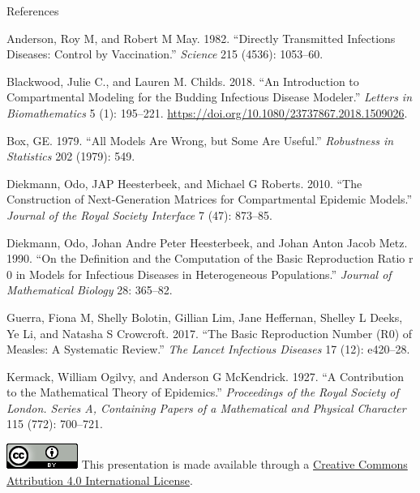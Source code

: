 \documentclass[
  ignorenonframetext,
]{beamer}
\newlength{\cslhangindent}
\newenvironment{CSLReferences}[2] %
 {\begin{list}{}{%
  \setlength{\itemindent}{0pt}
  \setlength{\leftmargin}{0pt}
  \setlength{\parsep}{0pt}
  \ifodd #1
   \setlength{\leftmargin}{\cslhangindent}
   \setlength{\itemindent}{-1\cslhangindent}
  \fi
  \setlength{\itemsep}{#2\baselineskip}}}
 {\end{list}}
\begin{document}
\begin{frame}
\begin{block}{References}
\label{references}
\label{refs}
\begin{CSLReferences}{1}{0}
Anderson, Roy M, and Robert M May. 1982. {``Directly Transmitted
Infections Diseases: Control by Vaccination.''} \emph{Science} 215
(4536): 1053--60.

Blackwood, Julie C., and Lauren M. Childs. 2018. {``An Introduction to
Compartmental Modeling for the Budding Infectious Disease Modeler.''}
\emph{Letters in Biomathematics} 5 (1): 195--221.
\url{https://doi.org/10.1080/23737867.2018.1509026}.

Box, GE. 1979. {``All Models Are Wrong, but Some Are Useful.''}
\emph{Robustness in Statistics} 202 (1979): 549.

Diekmann, Odo, JAP Heesterbeek, and Michael G Roberts. 2010. {``The
Construction of Next-Generation Matrices for Compartmental Epidemic
Models.''} \emph{Journal of the Royal Society Interface} 7 (47):
873--85.

Diekmann, Odo, Johan Andre Peter Heesterbeek, and Johan Anton Jacob
Metz. 1990. {``On the Definition and the Computation of the Basic
Reproduction Ratio r 0 in Models for Infectious Diseases in
Heterogeneous Populations.''} \emph{Journal of Mathematical Biology} 28:
365--82.

Guerra, Fiona M, Shelly Bolotin, Gillian Lim, Jane Heffernan, Shelley L
Deeks, Ye Li, and Natasha S Crowcroft. 2017. {``The Basic Reproduction
Number (R0) of Measles: A Systematic Review.''} \emph{The Lancet
Infectious Diseases} 17 (12): e420--28.

Kermack, William Ogilvy, and Anderson G McKendrick. 1927. {``A
Contribution to the Mathematical Theory of Epidemics.''}
\emph{Proceedings of the Royal Society of London. Series A, Containing
Papers of a Mathematical and Physical Character} 115 (772): 700--721.

\end{CSLReferences}
\end{block}
\end{frame}

\begin{frame}
\includegraphics{slides_files/mediabag/88x31.png} This presentation is
made available through a
\href{https://creativecommons.org/licenses/by/4.0/}{Creative Commons
Attribution 4.0 International License}.
\end{frame}
\end{document}

